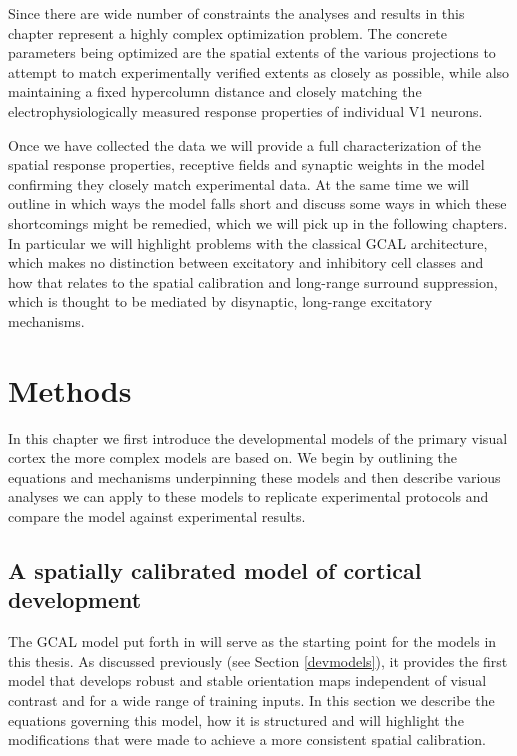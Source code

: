 Since there are wide number of constraints the analyses and results in
this chapter represent a highly complex optimization problem. The
concrete parameters being optimized are the spatial extents of the
various projections to attempt to match experimentally verified
extents as closely as possible, while also maintaining a fixed
hypercolumn distance and closely matching the electrophysiologically
measured response properties of individual V1 neurons.

Once we have collected the data we will provide a full
characterization of the spatial response properties, receptive fields
and synaptic weights in the model confirming they closely match
experimental data. At the same time we will outline in which ways the
model falls short and discuss some ways in which these shortcomings
might be remedied, which we will pick up in the following chapters.
In particular we will highlight problems with the classical GCAL
architecture, which makes no distinction between excitatory and
inhibitory cell classes and how that relates to the spatial
calibration and long-range surround suppression, which is thought to
be mediated by disynaptic, long-range excitatory mechanisms.

\section{Methods}

In this chapter we first introduce the developmental models of the
primary visual cortex the more complex models are based on. We begin
by outlining the equations and mechanisms underpinning these models
and then describe various analyses we can apply to these models to
replicate experimental protocols and compare the model against
experimental results.

\subsection{A spatially calibrated model of cortical development} 

The GCAL model put forth in \cite{Stevens2013} will serve as the
starting point for the models in this thesis. As discussed previously
(see Section \ref{devmodels}), it provides the first model that
develops robust and stable orientation maps independent of visual
contrast and for a wide range of training inputs. In this section we
describe the equations governing this model, how it is structured and
will highlight the modifications that were made to achieve a more
consistent spatial calibration.

